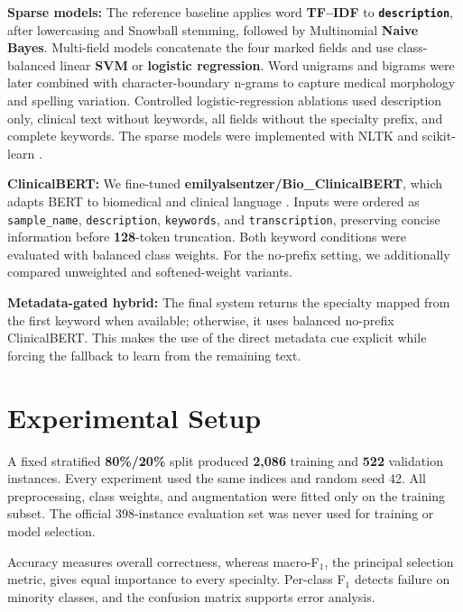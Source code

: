 \documentclass[twocolumn,10pt]{article}
\begin{document}
\textbf{Sparse models:}
The reference baseline applies word \textbf{TF--IDF} to \textbf{\texttt{description}}, after lowercasing and Snowball stemming, followed by Multinomial \textbf{Naive Bayes}. Multi-field models concatenate the four marked fields and use class-balanced linear \textbf{SVM} or \textbf{logistic regression}. Word unigrams and bigrams were later combined with character-boundary n-grams to capture medical morphology and spelling variation. Controlled logistic-regression ablations used description only, clinical text without keywords, all fields without the specialty prefix, and complete keywords. The sparse models were implemented with NLTK and scikit-learn \cite{bird2009nltk,pedregosa2011scikit}.

\textbf{ClinicalBERT:}
We fine-tuned \textbf{emilyalsentzer/Bio\_ClinicalBERT}, which adapts BERT to biomedical and clinical language \cite{devlin2019bert,alsentzer2019clinicalbert}. Inputs were ordered as \texttt{sample\_name}, \texttt{description}, \texttt{keywords}, and \texttt{transcription}, preserving concise information before \textbf{128}-token truncation. Both keyword conditions were evaluated with balanced class weights. For the no-prefix setting, we additionally compared unweighted and softened-weight variants.

\textbf{Metadata-gated hybrid:}
The final system returns the specialty mapped from the first keyword when available; otherwise, it uses balanced no-prefix ClinicalBERT. This makes the use of the direct metadata cue explicit while forcing the fallback to learn from the remaining text.
\vspace{-0.45cm}
 
\section*{\vspace{-0.3cm}Experimental Setup}

A fixed stratified \textbf{80\%/20\%} split produced \textbf{2,086} training and \textbf{522} validation instances. Every experiment used the same indices and random seed 42. All preprocessing, class weights, and augmentation were fitted only on the training subset. The official 398-instance evaluation set was never used for training or model selection.

Accuracy measures overall correctness, whereas macro-F$_1$, the principal selection metric, gives equal importance to every specialty. Per-class F$_1$ detects failure on minority classes, and the confusion matrix supports error analysis.
 
\end{document}

